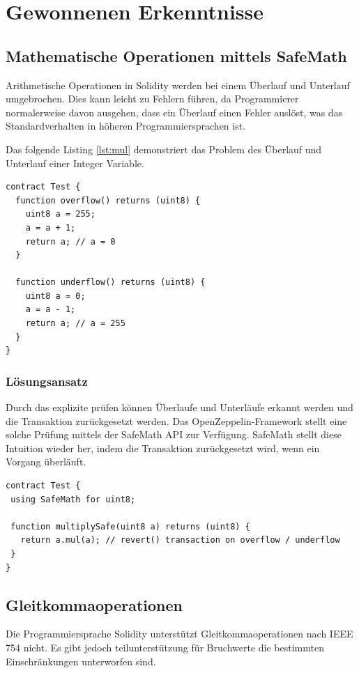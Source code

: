 \section{Gewonnenen Erkenntnisse}


\subsection{Mathematische Operationen mittels SafeMath}
Arithmetische Operationen in Solidity werden bei einem Überlauf und Unterlauf umgebrochen. Dies kann leicht zu Fehlern führen, da Programmierer normalerweise davon ausgehen, dass ein Überlauf einen Fehler auslöst, was das Standardverhalten in höheren Programmiersprachen ist.

Das folgende Listing \ref{lst:mul} demonstriert das Problem des Überlauf und Unterlauf einer Integer Variable.

\begin{lstlisting}[caption={Beispielhafter Überlauf und Unterlauf},captionpos=b,label=lst:mul]
contract Test {
  function overflow() returns (uint8) {
    uint8 a = 255;
    a = a + 1;  	
    return a; // a = 0
  }
  
  function underflow() returns (uint8) {
    uint8 a = 0;
    a = a - 1;  	
    return a; // a = 255
  }
}
\end{lstlisting}

\subsubsection*{Lösungsansatz}
Durch das explizite prüfen können Überlaufe und Unterläufe erkannt werden und die Transaktion zurückgesetzt werden. Das OpenZeppelin-Framework stellt eine solche Prüfung mittels der SafeMath API zur Verfügung. SafeMath stellt diese Intuition wieder her, indem die Transaktion zurückgesetzt wird, wenn ein Vorgang überläuft. \cite{safemath}

\begin{lstlisting}[caption={Beispielhafte Multiplikation mittels SafeMath zurück},captionpos=b,label=lst:mulsafe]
contract Test {
 using SafeMath for uint8;

 function multiplySafe(uint8 a) returns (uint8) {
   return a.mul(a); // revert() transaction on overflow / underflow
 }
}
\end{lstlisting}


\subsection{Gleitkommaoperationen}
Die Programmiersprache Solidity unterstützt Gleitkommaoperationen nach IEEE 754 nicht. Es gibt jedoch teilunterstützung für Bruchwerte die bestimmten Einschränkungen unterworfen sind.\cite{fixedpointnumbers}


